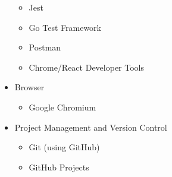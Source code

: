 \begin{itemize}
  \begin{itemize}
      \item Jest
      \item Go Test Framework
      \item Postman
      \item Chrome/React Developer Tools
  \end{itemize}
  \item Browser
  \begin{itemize}
      \item Google Chromium
  \end{itemize}
  \item Project Management and Version Control
  \begin{itemize}
      \item Git (using GitHub)
      \item GitHub Projects
  \end{itemize}
\end{itemize}